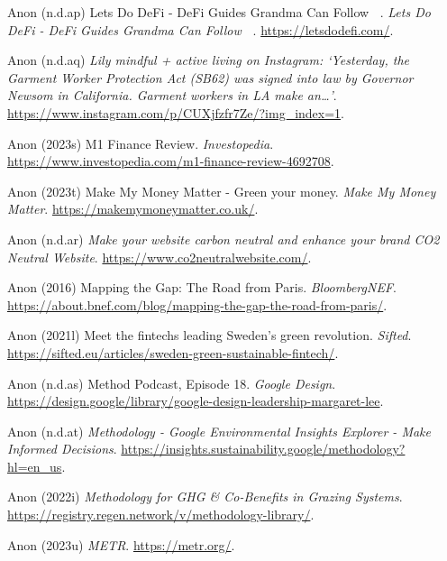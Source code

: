 \documentclass[
  letterpaper,
  DIV=11,
  numbers=noendperiod]{scrartcl}
\newlength{\cslhangindent}
\newenvironment{CSLReferences}[2] %
 {\begin{list}{}{%
  \setlength{\itemindent}{0pt}
  \setlength{\leftmargin}{0pt}
  \setlength{\parsep}{0pt}
  \ifodd #1
   \setlength{\leftmargin}{\cslhangindent}
   \setlength{\itemindent}{-1\cslhangindent}
  \fi
  \setlength{\itemsep}{#2\baselineskip}}}
 {\end{list}}
\begin{document}
\begin{CSLReferences}{0}{1}
Anon (n.d.ap) Lets {Do DeFi} - {DeFi Guides Grandma Can Follow} 👵🏻.
\emph{Lets Do DeFi - DeFi Guides Grandma Can Follow 👵🏻}.
\url{https://letsdodefi.com/}.

Anon (n.d.aq) \emph{Lily {\textbar} mindful + active living on
{Instagram}: {`{Yesterday}, the {Garment Worker Protection Act} ({SB62})
was signed into law by {Governor Newsom} in {California}. {Garment}
workers in {LA} make an{\ldots{}}'}}.
\url{https://www.instagram.com/p/CUXjfzfr7Ze/?img_index=1}.

Anon (2023s) M1 {Finance Review}. \emph{Investopedia}.
\url{https://www.investopedia.com/m1-finance-review-4692708}.

Anon (2023t) Make {My Money Matter} - {Green} your money. \emph{Make My
Money Matter}. \url{https://makemymoneymatter.co.uk/}.

Anon (n.d.ar) \emph{Make your website carbon neutral and enhance your
brand {\textbar} {CO2 Neutral Website}}.
\url{https://www.co2neutralwebsite.com/}.

Anon (2016) Mapping the {Gap}: The {Road} from {Paris}.
\emph{BloombergNEF}.
\url{https://about.bnef.com/blog/mapping-the-gap-the-road-from-paris/}.

Anon (2021l) Meet the fintechs leading {Sweden}'s green revolution.
\emph{Sifted}.
\url{https://sifted.eu/articles/sweden-green-sustainable-fintech/}.

Anon (n.d.as) Method {Podcast}, {Episode} 18. \emph{Google Design}.
\url{https://design.google/library/google-design-leadership-margaret-lee}.

Anon (n.d.at) \emph{Methodology - {Google Environmental Insights
Explorer} - {Make Informed Decisions}}.
\url{https://insights.sustainability.google/methodology?hl=en_us}.

Anon (2022i) \emph{Methodology for {GHG} \& {Co-Benefits} in {Grazing
Systems}}. \url{https://registry.regen.network/v/methodology-library/}.

Anon (2023u) \emph{{METR}}. \url{https://metr.org/}.


\end{CSLReferences}
\end{document}
